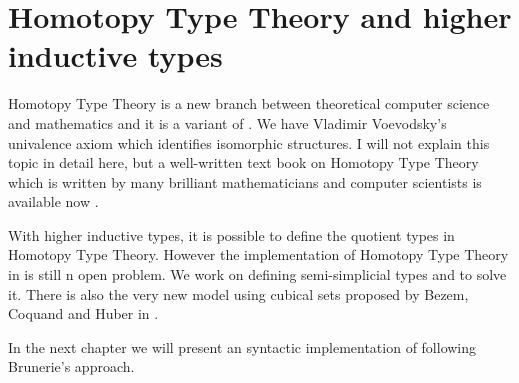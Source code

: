 \chapter{Homotopy Type Theory and higher inductive types}\label{HITs}


Homotopy Type Theory is a new branch between theoretical computer science
and mathematics and it is a variant of \mltt{}. We have 
Vladimir Voevodsky's univalence axiom which identifies isomorphic structures.
I will not explain this topic in detail here, but a well-written text
book on Homotopy Type Theory which is written by many brilliant mathematicians and computer
scientists is available now \cite{hott-online}. 

With higher inductive types, it is possible to define the quotient
types in Homotopy Type Theory. However the implementation of
Homotopy Type Theory in \itt{} is still n open problem. We
work on defining semi-simplicial types and \wog{} to solve it. There
is also the very new model using cubical sets proposed by Bezem,
Coquand and Huber in \cite{bezem2013model}.

In the next chapter we will present an syntactic implementation of \wog{} following
Brunerie's approach. 